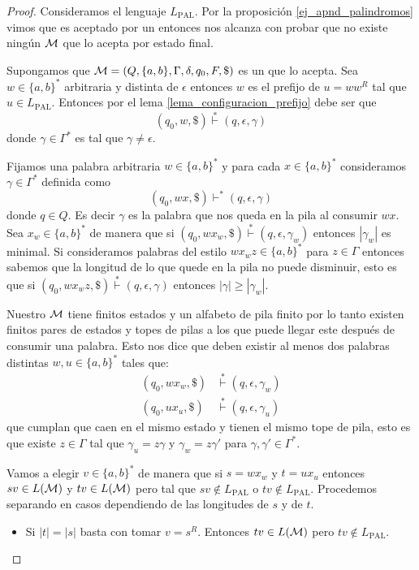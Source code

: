 \documentclass[tesis.tex]{subfiles}
\begin{document}
\begin{proof}
	Consideramos el lenguaje $L_{\text{PAL}}$.
	Por la proposición \ref{ej_apnd_palindromos} vimos que es aceptado por un \APND entonces nos alcanza con probar que no existe ningún $\cal M$ \APD que lo acepta por estado final.
	
	Supongamos que ${\cal {M}} = (Q, \{ a, b \}, \Gamma, \delta, q_0, F, \$)$ es un \APD que lo acepta. 
	Sea $w \in \{ a,b \}^*$ arbitraria y distinta de $\epsilon$ entonces $w$ es el prefijo de $u = ww^R$ tal que $u \in L_{\text{PAL}}$.
	Entonces por el lema \ref{lema_configuracion_prefijo} debe ser que
	\[
	(q_{0},w,\$) \overset{*}{\vdash} (q, \epsilon, \gamma)
	\]
	donde $\gamma \in \Gamma^*$ es tal que $\gamma \neq \epsilon$.
	
	
	Fijamos una palabra arbitraria $w \in \{ a,b \}^*$ y para cada $x \in \{ a,b \}^*$ consideramos $\gamma \in \Gamma^*$ definida como
	\[
		(q_{0}, wx, \$) \vdash^* (q,\epsilon,\gamma)
	\]
	donde $q \in Q$. 
	Es decir $\gamma$ es la palabra que nos queda en la pila al consumir $wx$.
	Sea $x_{w} \in \{ a, b\}^*$ de manera que si
	$(q_{0}, wx_{w}, \$) \overset{*}{\vdash} (q, \epsilon, \gamma_{w})$ entonces $|\gamma_{w}|$ es minimal.
	Si consideramos palabras del estilo $wx_wz \in \{a,b\}^*$ para $z \in \Gamma$ entonces sabemos que la longitud de lo que quede en la pila no puede disminuir, esto es que si $(q_{0}, wx_{w}z, \$) \overset{*}{\vdash} (q, \epsilon, \gamma)$ entonces $|\gamma| \ge |\gamma_{w}|$.
	
	Nuestro \APD $\cal M$ tiene finitos estados y un alfabeto de pila finito por lo tanto existen finitos pares de estados y topes de pilas a los que puede llegar este \APD después de consumir una palabra.
	Esto nos dice que deben existir al menos dos palabras distintas $w, u \in \{ a, b\}^*$ tales que:
	\begin{align*}
		(q_{0}, wx_{w}, \$) & \overset{*}{\vdash} (q, \epsilon, \gamma_{w}) \\
		(q_{0}, ux_{u}, \$) & \overset{*}{\vdash} (q, \epsilon, \gamma_{u})
	\end{align*}
	que cumplan que caen en el mismo estado y tienen el mismo tope de pila, esto es que existe $z \in \Gamma$ tal que $\gamma_{u} = z \gamma$ y $\gamma_{w} = z \gamma'$ para $\gamma, \gamma' \in \Gamma^{*}$.
	
	
	Vamos a elegir $v \in \{ a,b\}^*$ de manera que si $s = wx_{w}$ y $t = ux_{u}$ entonces $sv \in L(\cal M)$ y $tv \in L(\cal M)$ pero
	tal que $sv \notin L_{\text{PAL}}$ o $tv \notin L_{\text{PAL}}$.
	Procedemos separando en casos dependiendo de las longitudes de $s$ y de $t$.
	\begin{itemize}
		\item Si $|t|=|s|$ basta con tomar $v=s^R$. 
		Entonces $tv \in L({\cal M})$ pero $tv \notin L_{\text{PAL}}$.
		

\end{itemize}
\end{proof}
\end{document}
